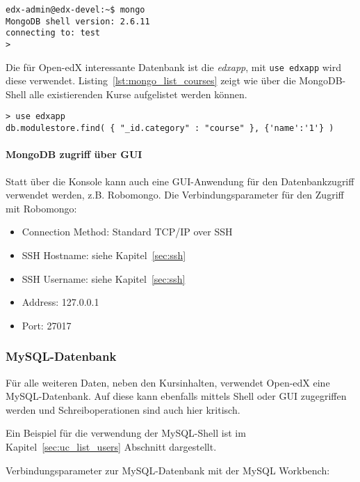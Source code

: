 \documentclass{scrartcl}
\begin{document}
\begin{lstlisting}[caption={MongoDB shell}, label=lst:mongo]
edx-admin@edx-devel:~$ mongo
MongoDB shell version: 2.6.11
connecting to: test
> 
\end{lstlisting}

Die für Open-edX interessante Datenbank ist die \textit{edxapp}, mit \lstinline|use edxapp| wird diese verwendet. Listing~\ref{lst:mongo_list_courses} zeigt wie über die MongoDB-Shell alle existierenden Kurse aufgelistet werden können.

\begin{lstlisting}[caption={Auflisten aller Kurse}, label=lst:mongo_list_courses]
> use edxapp
db.modulestore.find( { "_id.category" : "course" }, {'name':'1'} )
\end{lstlisting}

\paragraph{MongoDB zugriff über GUI}

Statt über die Konsole kann auch eine GUI-Anwendung für den Datenbankzugriff verwendet werden, z.B. Robomongo. Die Verbindungsparameter für den Zugriff mit Robomongo:

\begin{itemize}
\item Connection Method: Standard TCP/IP over SSH
\item SSH Hostname: siehe Kapitel~\ref{sec:ssh}
\item SSH Username: siehe Kapitel~\ref{sec:ssh}
\item Address: 127.0.0.1
\item Port: 27017
\end{itemize}

\subsubsection{MySQL-Datenbank}

Für alle weiteren Daten, neben den Kursinhalten, verwendet Open-edX eine MySQL-Datenbank. Auf diese kann ebenfalls mittels Shell oder GUI zugegriffen werden und Schreiboperationen sind auch hier kritisch.

Ein Beispiel für die verwendung der MySQL-Shell ist im Kapitel~\ref{sec:uc_list_users} Abschnitt  dargestellt.

Verbindungsparameter zur MySQL-Datenbank mit der MySQL Workbench:
\end{document}
